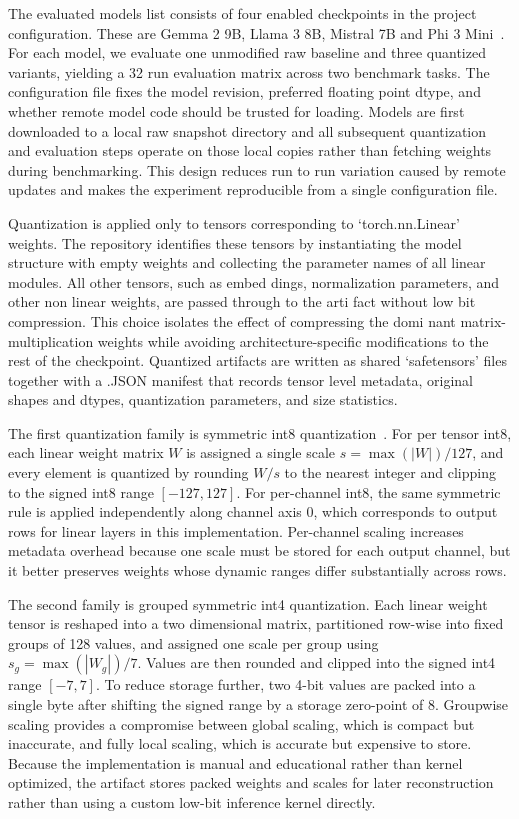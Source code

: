 \documentclass[11pt,twocolumn]{article}
\begin{document}
The evaluated models list consists of four enabled checkpoints in the project configuration. These are Gemma 2 9B, Llama 3 8B, Mistral 7B and Phi 3 Mini~\cite{gemma2,llama3herd,jiang2023mistral,abdin2024phi3}. For each model, we evaluate one unmodified raw baseline and three quantized variants, yielding a 32 run evaluation matrix across two benchmark tasks. The configuration file fixes the model revision, preferred floating point dtype, and whether remote model code should be trusted for loading. Models are first downloaded to a local raw snapshot directory and all subsequent quantization and evaluation steps operate on those local copies rather than fetching weights during benchmarking. This design reduces run to run variation caused by remote updates and makes the experiment reproducible from a single configuration file.

Quantization is applied only to tensors corresponding to ‘torch.nn.Linear’ weights. The repository identifies these tensors by instantiating the model structure with empty weights and collecting the parameter names of all linear modules. All other tensors, such as embed dings, normalization parameters, and other non linear weights, are passed through to the arti fact without low bit compression. This choice isolates the effect of compressing the domi nant matrix-multiplication weights while avoiding architecture-specific modifications to the rest of the checkpoint. Quantized artifacts are written as shared ‘safetensors’ files together with a .JSON manifest that records tensor level metadata, original shapes and dtypes, quantization parameters, and size statistics. 

The first quantization family is symmetric int8 quantization~\cite{wu2020integerquantization,dettmers2022llmint8,xiao2023smoothquant}. For per tensor int8, each linear weight matrix $W$ is assigned a single scale $s = \max(|W|)/127$, and every element is quantized by rounding $W/s$ to the nearest integer and clipping to the signed int8 range $[-127,127]$. For per-channel int8, the same symmetric rule is applied independently along channel axis 0, which corresponds to output rows for linear layers in this implementation. Per-channel scaling increases metadata overhead because one scale must be stored for each output channel, but it better preserves weights whose dynamic ranges differ substantially across rows.

The second family is grouped symmetric int4 quantization. Each linear weight tensor is reshaped into a two dimensional matrix, partitioned row-wise into fixed groups of 128 values, and assigned one scale per group using $s_g = \max(|W_g|)/7$. Values are then rounded and clipped into the signed int4 range $[-7,7]$. To reduce storage further, two 4-bit values are packed into a single byte after shifting the signed range by a storage zero-point of 8. Groupwise scaling provides a compromise between global scaling, which is compact but inaccurate, and fully local scaling, which is accurate but expensive to store. Because the implementation is manual and educational rather than kernel optimized, the artifact stores packed weights and scales for later reconstruction rather than using a custom low-bit inference kernel directly.
\end{document}

